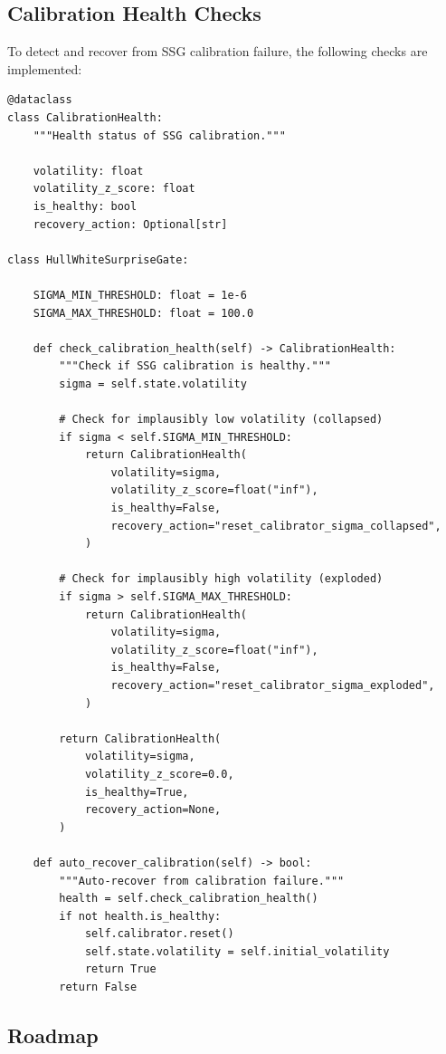 \subsection{Calibration Health Checks}

To detect and recover from SSG calibration failure, the following checks are
implemented:

\begin{lstlisting}[language=jsonx,caption={Calibration health check}]
@dataclass
class CalibrationHealth:
    """Health status of SSG calibration."""
    
    volatility: float
    volatility_z_score: float
    is_healthy: bool
    recovery_action: Optional[str]

class HullWhiteSurpriseGate:
    
    SIGMA_MIN_THRESHOLD: float = 1e-6
    SIGMA_MAX_THRESHOLD: float = 100.0
    
    def check_calibration_health(self) -> CalibrationHealth:
        """Check if SSG calibration is healthy."""
        sigma = self.state.volatility
        
        # Check for implausibly low volatility (collapsed)
        if sigma < self.SIGMA_MIN_THRESHOLD:
            return CalibrationHealth(
                volatility=sigma,
                volatility_z_score=float("inf"),
                is_healthy=False,
                recovery_action="reset_calibrator_sigma_collapsed",
            )
        
        # Check for implausibly high volatility (exploded)
        if sigma > self.SIGMA_MAX_THRESHOLD:
            return CalibrationHealth(
                volatility=sigma,
                volatility_z_score=float("inf"),
                is_healthy=False,
                recovery_action="reset_calibrator_sigma_exploded",
            )
        
        return CalibrationHealth(
            volatility=sigma,
            volatility_z_score=0.0,
            is_healthy=True,
            recovery_action=None,
        )
    
    def auto_recover_calibration(self) -> bool:
        """Auto-recover from calibration failure."""
        health = self.check_calibration_health()
        if not health.is_healthy:
            self.calibrator.reset()
            self.state.volatility = self.initial_volatility
            return True
        return False
\end{lstlisting}

\subsection{Roadmap}

